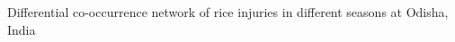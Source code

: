 Differential co-occurrence network of rice injuries in different seasons at Odisha, India
\label{fig:difseasonOD}